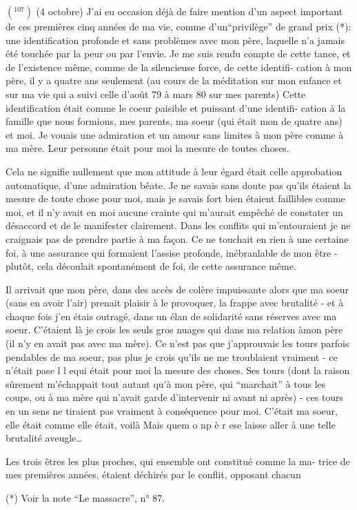 $({}^{107})$ (4 octobre) J'ai eu occasion déjà de faire mention d'un aspect important
de ces premières cinq années de ma vie, comme d'un``privilège'' de grand prix (*):
une identification profonde et sans problèmes avec mon père, laquelle n'a jamais
été touchée par la peur ou par l'envie. Je me suis rendu compte de cette \newline
tance, et de l'existence même, comme de la silencieuse force, de cette identifi-\newline
cation à mon père, il y a quatre ans seulement (au cours de la méditation sur
mon enfance et sur ma vie qui a suivi celle d'août 79 à mars 80 sur mes parents)
Cette identification était comme le coeur paisible et puissant d'une identifi-\newline
cation à la famille que nous formions, mes parents, ma soeur (qui était mon 
de quatre ans) et moi. Je vouais une admiration et un amour sans limites à mon
père comme à ma mère. Leur personne était pour moi la mesure de toutes choses.

Cela ne signifie nullement que mon attitude à leur égard était celle 
approbation automatique, d'une admiration béate. Je ne savais sans doute pas
qu'ils étaient la mesure de toute chose pour moi, mais je savais fort bien 
étaient faillibles comme moi, et il n'y avait en moi aucune crainte qui m'aurait
empêché de constater un désaccord et de le manifester clairement. Dans les
conflits qui m'entouraient\unsure{;|,} je ne craignais pas de prendre partie à ma façon. Ce
ne touchait en rien à une certaine foi, à une assurance qui formaient l'assise
profonde, inébranlable de mon être - plutôt, cela découlait spontanément de 
foi, de cette assurance même.

Il arrivait que mon père, dans des accès de colère impuissante alors que
ma soeur (sans en avoir l'air) prenait plaisir à le provoquer, la frappe avec
brutalité - et à chaque fois j'en étais outragé, dans un élan de solidarité sans
réserves avec ma soeur. C'étaient là je crois les seuls gros nuages qui 
dans ma relation à\unsure{:}mon père (il n'y en avait pas avec ma mère). Ce n'est pas que
j'approuvais les tours parfois pendables de ma soeur, pas plus je crois qu'ils
ne me troublaient vraiment - ce n'était pas\quad e l l e\quad qui était pour moi la
mesure des choses. Ses tours (dont la raison sûrement m'échappait tout autant
qu'à mon père, qui ``marchait'' à tous les coups, ou à ma mère qui n'avait garde
d'intervenir ni avant ni après) - ces tours en un sens ne tiraient pas vraiment
à conséquence pour moi. C'était ma soeur, elle était comme elle était, voilà 
Mais que\quad m o n\quad p è r e\quad se laisse aller à une telle brutalité aveugle\ldots

Les trois êtres les plus proches, qui ensemble ont constitué comme la ma-\newline
trice de mes premières années, étaient déchirés par le conflit, opposant chacun

(*) Voir la note ``Le massacre'', n° 87.
